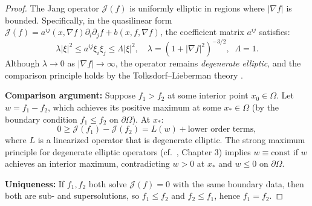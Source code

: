 \begin{proof}
The Jang operator $\mathcal{J}(f)$ is uniformly elliptic in regions where $|\nabla f|$ is bounded. Specifically, in the quasilinear form $\mathcal{J}(f) = a^{ij}(x, \nabla f)\partial_i \partial_j f + b(x, f, \nabla f)$, the coefficient matrix $a^{ij}$ satisfies:
\[
    \lambda |\xi|^2 \le a^{ij}\xi_i\xi_j \le \Lambda|\xi|^2, 
    \quad \lambda = (1+|\nabla f|^2)^{-3/2}, \;\; \Lambda = 1.
\]
Although $\lambda \to 0$ as $|\nabla f| \to \infty$, the operator remains \emph{degenerate elliptic}, and the comparison principle holds by the Tolksdorf--Lieberman theory \cite{tolksdorf1984,lieberman1988}.

\textbf{Comparison argument:} Suppose $f_1 > f_2$ at some interior point $x_0 \in \Omega$. Let $w = f_1 - f_2$, which achieves its positive maximum at some $x_* \in \Omega$ (by the boundary condition $f_1 \le f_2$ on $\partial\Omega$). At $x_*$:
\[
    0 \ge \mathcal{J}(f_1) - \mathcal{J}(f_2) = L(w) + \text{lower order terms},
\]
where $L$ is a linearized operator that is degenerate elliptic. The strong maximum principle for degenerate elliptic operators (cf.~\cite{gilbarg2001}, Chapter 3) implies $w \equiv \text{const}$ if $w$ achieves an interior maximum, contradicting $w > 0$ at $x_*$ and $w \le 0$ on $\partial\Omega$.

\textbf{Uniqueness:} If $f_1, f_2$ both solve $\mathcal{J}(f) = 0$ with the same boundary data, then both are sub- and supersolutions, so $f_1 \le f_2$ and $f_2 \le f_1$, hence $f_1 = f_2$.
\end{proof}

